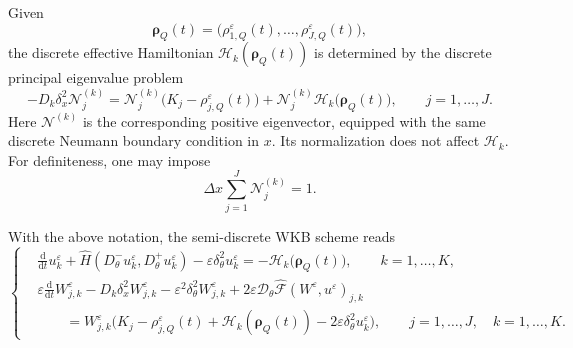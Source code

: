 \documentclass[11pt, dina4, amsfont12]{article}
\begin{document}
Given
\[
\boldsymbol\rho_Q(t)
=
\bigl(\rho_{1,Q}^\varepsilon(t),\dots,\rho_{J,Q}^\varepsilon(t)\bigr),
\]
the discrete effective Hamiltonian
\(\mathcal H_k(\boldsymbol\rho_Q(t))\) is determined by the discrete
principal eigenvalue problem
\begin{equation}\label{eq:eigen_discrete}
-D_k\delta_x^2\mathcal N_j^{(k)}
=
\mathcal N_j^{(k)}
\bigl(K_j-\rho_{j,Q}^\varepsilon(t)\bigr)
+
\mathcal N_j^{(k)}
\mathcal H_k\bigl(\boldsymbol\rho_Q(t)\bigr),
\qquad
j=1,\dots,J .
\end{equation}
Here \(\mathcal N^{(k)}\) is the corresponding positive eigenvector, equipped
with the same discrete Neumann boundary condition in \(x\). Its normalization
does not affect \(\mathcal H_k\). For definiteness, one may impose
\[
\Delta x\sum_{j=1}^J \mathcal N_j^{(k)}=1 .
\]

With the above notation, the semi-discrete WKB scheme reads
\begin{equation}\label{eq:semi_discrete_WKB_system}
\left\{
\begin{aligned}
&\frac{\mathrm d}{\mathrm dt}u_k^\varepsilon
+
\widehat H
\left(
D_\theta^-u_k^\varepsilon,
D_\theta^+u_k^\varepsilon
\right)
-
\varepsilon\delta_\theta^2u_k^\varepsilon
=
-\mathcal H_k\bigl(\boldsymbol\rho_Q(t)\bigr),
\qquad
k=1,\dots,K,
\\[1mm]
&\varepsilon
\frac{\mathrm d}{\mathrm dt}W_{j,k}^\varepsilon
-
D_k\delta_x^2W_{j,k}^\varepsilon
-
\varepsilon^2\delta_\theta^2W_{j,k}^\varepsilon
+
2\varepsilon
\mathcal D_\theta
\widehat{\mathcal F}(W^\varepsilon,u^\varepsilon)_{j,k}
\\
&\qquad =
W_{j,k}^\varepsilon
\bigl(
K_j-\rho_{j,Q}^\varepsilon(t)
+\mathcal H_k(\boldsymbol\rho_Q(t))
-2\varepsilon\delta_\theta^2u_k^\varepsilon
\bigr),
\qquad
j=1,\dots,J,\quad k=1,\dots,K .
\end{aligned}
\right.
\end{equation}
\end{document}
